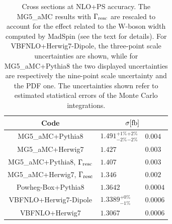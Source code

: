 \documentclass[twocolumn,epjc3]{svjour3} %
\newlength{\width}
\begin{document}
\begin{table}
    \centering
    \begin{tabular}{c|l@{ $\pm$ }l}
      Code  &  \multicolumn{2}{c}{$\sigma[\rm{fb}]$}  \\
        \hline\hline
        {\sc MG5\_aMC}+{\sc Pythia8}&  $1.491 ^{+1\%}_{-2\%} {}^{+2\%}_{-2\%} $ & $0.004$  \\
        {\sc MG5\_aMC}+{\sc Herwig7}&  $1.427 $ & $0.003$  \\
        {\sc MG5\_aMC}+{\sc Pythia8}, $\Gamma_{\rm resc}$&  $1.407$ & $0.003$  \\
        {\sc MG5\_aMC}+{\sc Herwig7}, $\Gamma_{\rm resc}$&  $1.346$ & $0.002$  \\
        {\sc Powheg-Box}+{\sc Pythia8}  & $1.3642$ & $0.0004$  \\
        {\sc VBFNLO}+{\sc Herwig7-Dipole} &  $1.3389 ^{+0\%}_{-1\%}$ & $0.0006$  \\
        {\sc VBFNLO}+{\sc Herwig7} &  $1.3067$ & $0.0006$  \\
    \end{tabular}
    \caption{\label{tab:PSratesNLO} Cross sections at NLO+PS accuracy.
    The {\sc MG5\_aMC} results with $\Gamma_{\rm resc}$
    are rescaled to account for the effect related to the W-boson width computed by {\sc MadSpin} (see the text for details). For
    {\sc VBFNLO}+{\sc Herwig7-Dipole}, the three-point scale uncertainties are shown, while for  {\sc MG5\_aMC}+{\sc Pythia8} the two displayed uncertainties
are respectively the nine-point scale uncertainty and the PDF one.
The uncertainties shown refer to estimated statistical errors of the Monte Carlo integrations.}
\end{table}
\end{document}
